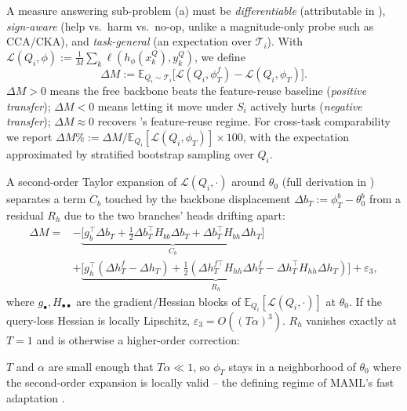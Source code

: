 A measure answering sub-problem (a) must be \emph{differentiable} (attributable in ), \emph{sign-aware} (help vs.\ harm vs.\ no-op, unlike a magnitude-only probe such as CCA/CKA), and \emph{task-general} (an expectation over $\mathcal{T}_i$). With $\mathcal{L}(Q_i,\phi):=\frac{1}{M}\sum_k \ell(h_\phi(x_k^Q),y_k^Q)$, we define
\begin{equation}
    \Delta M := \mathbb{E}_{Q_i\sim\mathcal{T}_i}\!\big[\mathcal{L}(Q_i,\phi_T^{f}) - \mathcal{L}(Q_i,\phi_T)\big].
    \label{eq:adaptation_gain}
\end{equation}
$\Delta M{>}0$ means the free backbone beats the feature-reuse baseline (\emph{positive transfer}); $\Delta M{<}0$ means letting it move under $S_i$ actively hurts (\emph{negative transfer}); $\Delta M{\approx}0$ recovers \citet{raghu2019rapid}'s feature-reuse regime. For cross-task comparability we report $\Delta M\%:=\Delta M/\mathbb{E}_{Q_i}[\mathcal{L}(Q_i,\phi_T)]\times 100$, with the expectation approximated by stratified bootstrap sampling over $Q_i$.

A second-order Taylor expansion of $\mathcal{L}(Q_i,\cdot)$ around $\theta_0$ (full derivation in ) separates a term $C_b$ touched by the backbone displacement $\Delta b_T := \phi_T^b-\theta_0^b$ from a residual $R_h$ due to the two branches' heads drifting apart:
\begin{equation}
\begin{split}
    \Delta M = &-\underbrace{\big[g_b^\top\Delta b_T+\tfrac{1}{2}\Delta b_T^\top H_{bb}\Delta b_T+\Delta b_T^\top H_{bh}\Delta h_T\big]}_{C_b}\\
    &+\underbrace{\big[g_h^\top(\Delta h_T^f{-}\Delta h_T)+\tfrac12(\Delta h_T^{f\top} H_{hh} \Delta h_T^f{-}\Delta h_T^\top H_{hh}\Delta h_T)\big]}_{R_h}+\varepsilon_3,
\end{split}
\label{eq:decomposition}
\end{equation}
where $g_\bullet,H_{\bullet\bullet}$ are the gradient/Hessian blocks of $\mathbb{E}_{Q_i}[\mathcal{L}(Q_i,\cdot)]$ at $\theta_0$. If the query-loss Hessian is locally Lipschitz, $\varepsilon_3=O((T\alpha)^3)$. $R_h$ vanishes exactly at $T{=}1$ and is otherwise a higher-order correction:

\begin{assumption}
\label{asm:fast_adaptation}
$T$ and $\alpha$ are small enough that $T\alpha\ll1$, so $\phi_T$ stays in a neighborhood of $\theta_0$ where the second-order expansion is locally valid \citep{grant2018recasting} -- the defining regime of MAML's fast adaptation \citep{finn2017model}.
\end{assumption}

